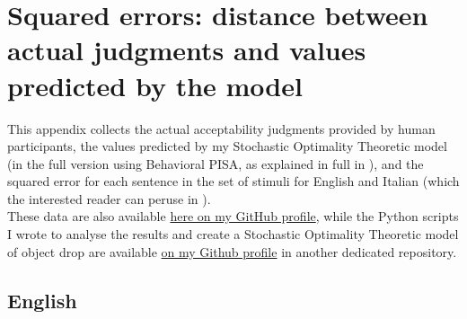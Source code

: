\setchapterpreamble[u]{\margintoc}
\chapter{Squared errors: distance between actual judgments and values predicted by the model}

This appendix collects the actual acceptability judgments provided by human participants, the values predicted by my Stochastic Optimality Theoretic model (in the full version using Behavioral PISA, as explained in full in ), and the squared error for each sentence in the set of stimuli for English and Italian (which the interested reader can peruse in ).\\
These data are also available \href{https://github.com/giuliacappelli/dissertationData}{here on my GitHub profile}, while the Python scripts I wrote to analyse the results and create a Stochastic Optimality Theoretic model of object drop are available \href{https://github.com/giuliacappelli/MedinaStochasticOptimalityTheory}{on my Github profile} in another dedicated repository.

\section{English}

